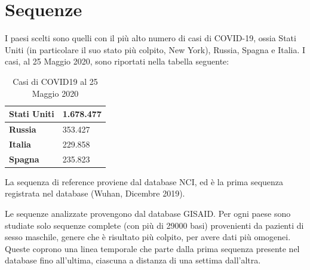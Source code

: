 \documentclass[a4paper,10pt]{article}
\begin{document}
\section{Sequenze}
I paesi scelti sono quelli con il più alto numero di casi di COVID-19, ossia Stati Uniti (in particolare il suo stato più colpito, New York), Russia, Spagna e Italia. I casi, al 25 Maggio 2020, sono riportati nella tabella seguente:

\begin{table}[H]
\centering
\begin{tabular}{|l|l|}
\hline
\textbf{Stati Uniti} & 1.678.477 \\ \hline
\textbf{Russia}      & 353.427   \\ \hline
\textbf{Italia}      & 229.858   \\ \hline
\textbf{Spagna}      & 235.823   \\ \hline
\end{tabular}
\caption{Casi di COVID19 al 25 Maggio 2020}
\end{table}
La sequenza di reference proviene dal database NCI, ed è la prima sequenza registrata nel database (Wuhan, Dicembre 2019).

\begin{table}[H]
\centering
{}
\caption{Sequenza di reference presa dal sito  \textcolor{black}{\href{https://www.ncbi.nlm.nih.gov/genbank/sars-cov-2-seqs/}{NCI}}}
\end{table}

Le sequenze analizzate provengono dal database GISAID. Per ogni paese sono studiate solo sequenze complete (con più di 29000 basi) provenienti da pazienti di sesso maschile, genere che è risultato più colpito, per avere dati più omogenei. Queste coprono una linea temporale che parte dalla prima sequenza presente nel database fino all'ultima, ciascuna a distanza di una settima dall'altra.
\end{document}
